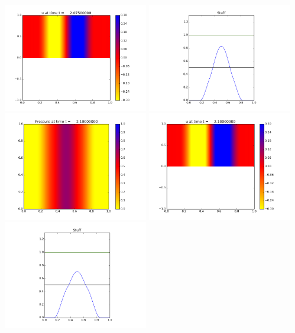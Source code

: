 \documentclass[11pt]{article}
\begin{document}
\includegraphics[width=0.475\textwidth]{frame0083fig1.png}
\vskip 10pt 
\includegraphics[width=0.475\textwidth]{frame0083fig3.png}
\vskip 10pt 
\includegraphics[width=0.475\textwidth]{frame0084fig0.png}
\includegraphics[width=0.475\textwidth]{frame0084fig1.png}
\vskip 10pt 
\includegraphics[width=0.475\textwidth]{frame0084fig3.png}
\end{document}
